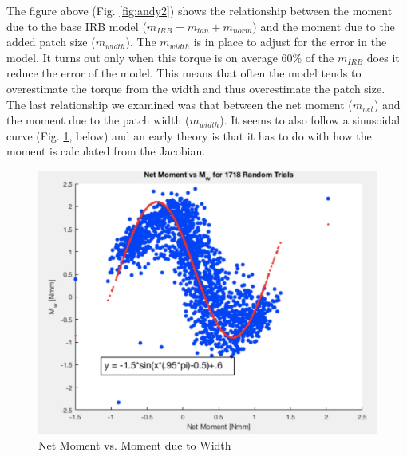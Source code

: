 \documentclass{article}
\begin{document}
\noindent The figure above (Fig. \ref{fig:andy2}) shows the relationship between the moment due to the base IRB model ($m_{IRB} = m_{tan} + m_{norm}$) and the moment due to the added patch size ($m_{width}$). The $m_{width}$ is in place to adjust for the error in the model. It turns out only when this torque is on average 60\% of the $m_{IRB}$ does it reduce the error of the model. This means that often the model tends to overestimate the torque from the width and thus overestimate the patch size.\\

\noindent The last relationship we examined was that between the net moment ($m_{net}$) and the moment due to the patch width ($m_{width}$). It seems to also follow a sinusoidal curve (Fig. \ref{fig:joah1}, below) and an early theory is that it has to do with how the moment is calculated from the Jacobian. 

\begin{figure}[t!]
\centering
\includegraphics[scale=0.5]{Joah1.jpg}
\caption{Net Moment vs. Moment due to Width}
\label{fig:joah1}
\end{figure}
\end{document}
